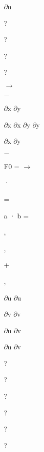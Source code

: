 \documentclass[a4paper,portrait,12pt]{article}
\begin{document}
\begin{flushleft}
$\partial$u
\end{flushleft}


?


?


?


?


$\rightarrow$


$-$


\begin{flushleft}
$\partial$x $\partial$y
\end{flushleft}


\begin{flushleft}
$\partial$x $\partial$x $\partial$y $\partial$y
\end{flushleft}


\begin{flushleft}
$\partial$x $\partial$y
\end{flushleft}


$-$


\begin{flushleft}
F0 = $\rightarrow$
\end{flushleft}


·


=


\begin{flushleft}
a · b =
\end{flushleft}


,


,


+


,


\begin{flushleft}
$\partial$u $\partial$u
\end{flushleft}


\begin{flushleft}
$\partial$v $\partial$v
\end{flushleft}


\begin{flushleft}
$\partial$u $\partial$v
\end{flushleft}


\begin{flushleft}
$\partial$u $\partial$v
\end{flushleft}


?


?


?


?


?


?
\end{document}
